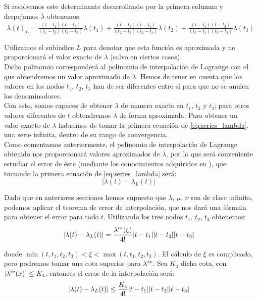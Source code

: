 Si resolvemos este determinante desarrollando por la primera columna y despejamos $\lambda$ obtenemos:
\begin{align}
\lambda(t)_L=
\frac{(t-t_2)(t-t_3)}{(t_1-t_2)(t_1-t_3)}\lambda(t_1)
+\frac{(t-t_3)(t-t_1)}{(t_2-t_3)(t_2-t_1)}\lambda(t_2)
+\frac{(t-t_1)(t-t_2)}{(t_3-t_1)(t_3-t_2)}\lambda(t_3)
\label{eq:lambda_value}
\end{align}

Utilizamos el subíndice $L$ para denotar que esta función es aproximada y no proporcionará el valor exacto de $\lambda$ (salvo en ciertos casos).\\

Dicho polinomio corresponderá al polinomio de interpolación de Lagrange con el que obtendremos un valor aproximado de $\lambda$. Hemos de tener en cuenta que los valores en los nodos $t_1$, $t_2$, $t_3$ han de ser diferentes entre sí para que no se anulen los denominadores.\\

Con esto, somos capaces de obtener $\lambda$ de manera exacta en $t_1$, $t_2$ y $t_3$; para otros valores diferentes de $t$ obtendremos $\lambda$ de forma aproximada. Para obtener un valor exacto de $\lambda$ habremos de tomar la primera ecuación de \eqref{eq:series_lambda}, una serie infinita, dentro de su rango de convergencia. \cite{moulton}\\

Como comentamos anteriormente, el polinomio de interpolación de Lagrange obtenido nos proporcionará valores aproximados de $\lambda$, por lo que será conveniente estudiar el error de éste (mediante los conocimientos adquiridos en \cite{MNII}), que tomando la primera ecuación de \eqref{eq:series_lambda} será:
\[
|\lambda(t)-\lambda_L(t)|
\]

Dado que en anteriores secciones hemos supuesto que $\lambda$, $\mu$, $\nu$ son de clase infinito, podemos aplicar el teorema de error de interpolación, que nos dará una fórmula para obtener el error para todo $t$. Utilizando los tres nodos $t_1$, $t_2$, $t_3$ obtenemos:
\begin{align}
|\lambda(t)-\lambda_L(t)|=\ddfrac{\lambda^{\romannumeral 4}(\xi)}{4!}|t-t_1||t-t_2||t-t_3|
\label{eq:interpolation_error}
\end{align}

\noindent donde $\min{(t,t_1,t_2,t_3)}<\xi<\max{(t,t_1,t_2,t_3)}$. El cálculo de $\xi$ es complicado, pero podremos tomar una cota superior para $\lambda^{\romannumeral 4}$. Sea $K_4$ dicha cota, con $|\lambda^{\romannumeral 4}(x)|\leq K_4$, entonces el error de la interpolación será:
\begin{align}
|\lambda(t)-\lambda_L(t)|\leq\frac{\displaystyle K_4}{\displaystyle 4!}|t-t_1||t-t_2||t-t_3|
\label{eq:interpolation_error_cota}
\end{align}

